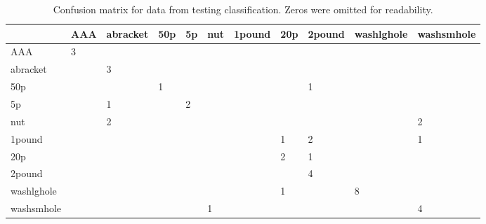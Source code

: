 \documentclass[12pt]{article}
\begin{document}
\begin{table}
	\centering
	\caption{Confusion matrix for data from testing classification. Zeros were omitted for readability.}
	\label{tab:conf}
	\begin{tabular}{l|l|l|l|l|l|l|l|l|l|l}
					& AAA & abracket & 50p & 5p & nut & 1pound & 20p & 2pound & washlghole & washsmhole \\ \hline
		AAA 		& 3   &          &     & 	&     & 	   &     &        &            &            \\ \hline
		abracket 	&     & 3        &     &  	&     & 	   &     &        &            &            \\ \hline
		50p 		&     &          & 1   & 	&     & 	   &     & 1      &            &            \\ \hline
		5p 			&     & 1        &     & 2	&     & 	   &     &        &            &            \\ \hline
		nut 		&     & 2    	 &     & 	&     & 	   &     &        &            & 2          \\ \hline
		1pound 		&     & 		 &     & 	&     & 	   & 1   & 2      &            & 1          \\ \hline
		20p		 	&     & 		 &     & 	&     & 	   & 2   & 1      &            &            \\ \hline
		2pound 		&     & 		 &     & 	&     & 	   &     & 4      &            &            \\ \hline
		washlghole 	&     & 		 &     & 	&     & 	   & 1   &        & 8          &            \\ \hline
		washsmhole 	&     & 		 &     & 	& 1   & 	   &     &        &            & 4         
	\end{tabular}
\end{table}
\end{document}
